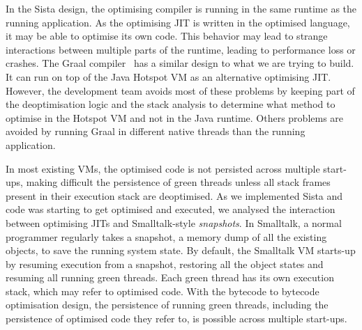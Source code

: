 \documentclass[a4paper,12pt,twoside]{../includes/ThesisStyle}
\begin{document}
In the Sista design, the optimising compiler is running in the same runtime as the running application. As the optimising JIT is written in the optimised language, it may be able to optimise its own code. This behavior may lead to strange interactions between multiple parts of the runtime, leading to performance loss or crashes. The Graal compiler~\cite{Dubo13c} has a similar design to what we are trying to build. It can run on top of the Java Hotspot VM as an alternative optimising JIT. However, the development team avoids most of these problems by keeping part of the deoptimisation logic and the stack analysis to determine what method to optimise in the Hotspot VM and not in the Java runtime. Others problems are avoided by running Graal in different native threads than the running application.

In most existing VMs, the optimised code is not persisted across multiple start-ups, making difficult the persistence of green threads unless all stack frames present in their execution stack are deoptimised. As we implemented Sista and code was starting to get optimised and executed, we analysed the interaction between optimising JITs and Smalltalk-style \emph{snapshots}. In Smalltalk, a normal programmer regularly takes a snapshot, a memory dump of all the existing objects, to save the running system state. By default, the Smalltalk VM starts-up by resuming execution from a snapshot, restoring all the object states and resuming all running green threads. Each green thread has its own execution stack, which may refer to optimised code. With the bytecode to bytecode optimisation design, the persistence of running green threads, including the persistence of optimised code they refer to, is possible across multiple start-ups.

\end{document}
